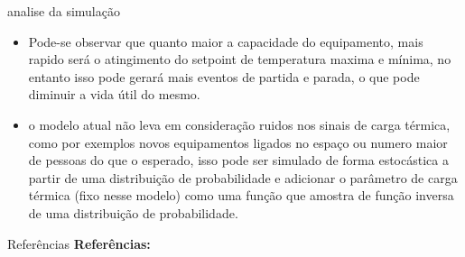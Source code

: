 \documentclass{beamer}
\begin{document}
\begin{frame}{analise da simulação}
	\begin{itemize}
		\item Pode-se observar que quanto maior a capacidade do equipamento, mais rapido será o atingimento do setpoint de temperatura maxima e mínima, no entanto isso pode gerará mais eventos de partida e parada, o que pode diminuir a vida útil do mesmo.
		\item o modelo atual não leva em consideração ruidos nos sinais de carga térmica, como por exemplos novos equipamentos ligados no espaço ou numero maior de pessoas do que o esperado, isso pode ser simulado de forma estocástica a partir de uma distribuição de probabilidade e adicionar o parâmetro de carga térmica (fixo nesse modelo) como uma função que amostra de função inversa de uma distribuição de probabilidade.
	\end{itemize}
\end{frame}
\begin{frame}{Referências}
	\textbf{Referências:}
	
	
\end{frame}
\end{document}
